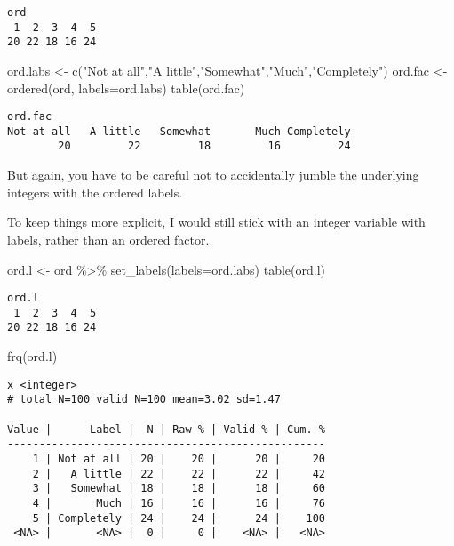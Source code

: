 \documentclass[
  letterpaper,
  DIV=11,
  numbers=noendperiod]{scrreprt}
\newenvironment{Shaded}{\begin{snugshade}}{\end{snugshade}}
\newcommand{\AttributeTok}[1]{\textcolor[rgb]{0.40,0.45,0.13}{#1}}
\newcommand{\FunctionTok}[1]{\textcolor[rgb]{0.28,0.35,0.67}{#1}}
\newcommand{\NormalTok}[1]{\textcolor[rgb]{0.00,0.23,0.31}{#1}}
\newcommand{\OtherTok}[1]{\textcolor[rgb]{0.00,0.23,0.31}{#1}}
\newcommand{\SpecialCharTok}[1]{\textcolor[rgb]{0.37,0.37,0.37}{#1}}
\newcommand{\StringTok}[1]{\textcolor[rgb]{0.13,0.47,0.30}{#1}}
\begin{document}
\begin{verbatim}
ord
 1  2  3  4  5 
20 22 18 16 24 
\end{verbatim}

\begin{Shaded}
\begin{Highlighting}[]
\NormalTok{ord.labs }\OtherTok{\textless{}{-}} \FunctionTok{c}\NormalTok{(}\StringTok{"Not at all"}\NormalTok{,}\StringTok{"A little"}\NormalTok{,}\StringTok{"Somewhat"}\NormalTok{,}\StringTok{"Much"}\NormalTok{,}\StringTok{"Completely"}\NormalTok{)}
\NormalTok{ord.fac }\OtherTok{\textless{}{-}} \FunctionTok{ordered}\NormalTok{(ord, }\AttributeTok{labels=}\NormalTok{ord.labs)}
\FunctionTok{table}\NormalTok{(ord.fac)}
\end{Highlighting}
\end{Shaded}

\begin{verbatim}
ord.fac
Not at all   A little   Somewhat       Much Completely 
        20         22         18         16         24 
\end{verbatim}

But again, you have to be careful not to accidentally jumble the
underlying integers with the ordered labels.

To keep things more explicit, I would still stick with an integer
variable with labels, rather than an ordered factor.

\begin{Shaded}
\begin{Highlighting}[]
\NormalTok{ord.l }\OtherTok{\textless{}{-}}\NormalTok{ ord }\SpecialCharTok{\%\textgreater{}\%}
  \FunctionTok{set\_labels}\NormalTok{(}\AttributeTok{labels=}\NormalTok{ord.labs)}
\FunctionTok{table}\NormalTok{(ord.l)}
\end{Highlighting}
\end{Shaded}

\begin{verbatim}
ord.l
 1  2  3  4  5 
20 22 18 16 24 
\end{verbatim}

\begin{Shaded}
\begin{Highlighting}[]
\FunctionTok{frq}\NormalTok{(ord.l)}
\end{Highlighting}
\end{Shaded}

\begin{verbatim}
x <integer> 
# total N=100 valid N=100 mean=3.02 sd=1.47

Value |      Label |  N | Raw % | Valid % | Cum. %
--------------------------------------------------
    1 | Not at all | 20 |    20 |      20 |     20
    2 |   A little | 22 |    22 |      22 |     42
    3 |   Somewhat | 18 |    18 |      18 |     60
    4 |       Much | 16 |    16 |      16 |     76
    5 | Completely | 24 |    24 |      24 |    100
 <NA> |       <NA> |  0 |     0 |    <NA> |   <NA>
\end{verbatim}
\end{document}
